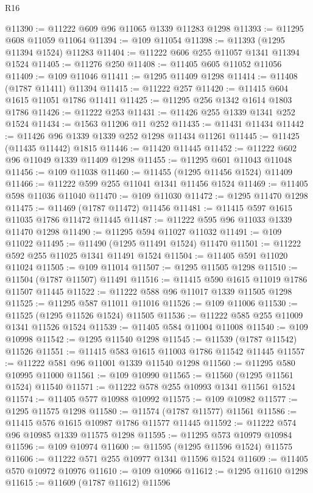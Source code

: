 \begin{lexlean}{R16}
\begin{coremodule}
@11390 := @11222 @609 @96 @11065 @1339 @11283 @1298
@11393 := @11295 @608 @11059 @11064
@11394 := @109 @11054
@11398 := @11393 (@1295 @11394 @1524) @11283
@11404 := @11222 @606 @255 @11057 @1341 @11394 @1524
@11405 := @11276 @250
@11408 := @11405 @605 @11052 @11056
@11409 := @109 @11046
@11411 := @1295 @11409 @1298
@11414 := @11408 (@1787 @11411) @11394
@11415 := @11222 @257
@11420 := @11415 @604 @1615 @11051 @1786 @11411
@11425 := @11295 @256 @1342 @1614 @1803 @1786
@11426 := @11222 @253
@11431 := @11426 @255 @1339 @1341 @252 @1524
@11434 := @1563 @11206 @11 @252
@11435 := @11431 @11434
@11442 := @11426 @96 @1339 @1339 @252 @1298 @11434 @11261
@11445 := @11425 (@11435 @11442) @1815
@11446 := @11420 @11445
@11452 := @11222 @602 @96 @11049 @1339 @11409 @1298
@11455 := @11295 @601 @11043 @11048
@11456 := @109 @11038
@11460 := @11455 (@1295 @11456 @1524) @11409
@11466 := @11222 @599 @255 @11041 @1341 @11456 @1524
@11469 := @11405 @598 @11036 @11040
@11470 := @109 @11030
@11472 := @1295 @11470 @1298
@11475 := @11469 (@1787 @11472) @11456
@11481 := @11415 @597 @1615 @11035 @1786 @11472 @11445
@11487 := @11222 @595 @96 @11033 @1339 @11470 @1298
@11490 := @11295 @594 @11027 @11032
@11491 := @109 @11022
@11495 := @11490 (@1295 @11491 @1524) @11470
@11501 := @11222 @592 @255 @11025 @1341 @11491 @1524
@11504 := @11405 @591 @11020 @11024
@11505 := @109 @11014
@11507 := @1295 @11505 @1298
@11510 := @11504 (@1787 @11507) @11491
@11516 := @11415 @590 @1615 @11019 @1786 @11507 @11445
@11522 := @11222 @588 @96 @11017 @1339 @11505 @1298
@11525 := @11295 @587 @11011 @11016
@11526 := @109 @11006
@11530 := @11525 (@1295 @11526 @1524) @11505
@11536 := @11222 @585 @255 @11009 @1341 @11526 @1524
@11539 := @11405 @584 @11004 @11008
@11540 := @109 @10998
@11542 := @1295 @11540 @1298
@11545 := @11539 (@1787 @11542) @11526
@11551 := @11415 @583 @1615 @11003 @1786 @11542 @11445
@11557 := @11222 @581 @96 @11001 @1339 @11540 @1298
@11560 := @11295 @580 @10995 @11000
@11561 := @109 @10990
@11565 := @11560 (@1295 @11561 @1524) @11540
@11571 := @11222 @578 @255 @10993 @1341 @11561 @1524
@11574 := @11405 @577 @10988 @10992
@11575 := @109 @10982
@11577 := @1295 @11575 @1298
@11580 := @11574 (@1787 @11577) @11561
@11586 := @11415 @576 @1615 @10987 @1786 @11577 @11445
@11592 := @11222 @574 @96 @10985 @1339 @11575 @1298
@11595 := @11295 @573 @10979 @10984
@11596 := @109 @10974
@11600 := @11595 (@1295 @11596 @1524) @11575
@11606 := @11222 @571 @255 @10977 @1341 @11596 @1524
@11609 := @11405 @570 @10972 @10976
@11610 := @109 @10966
@11612 := @1295 @11610 @1298
@11615 := @11609 (@1787 @11612) @11596

\end{coremodule}
\end{lexlean}
